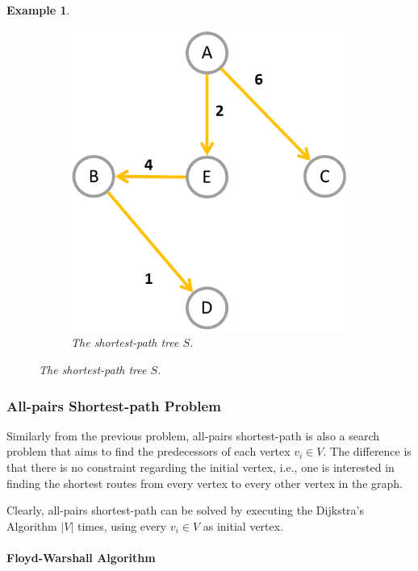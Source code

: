 \documentclass[12pt]{report}
\newtheorem{example}{Example}[section]
\begin{document}
\begin{example}
\begin{figure}[H]
\begin{subfigure}{.4\linewidth}
			\includegraphics[width=\linewidth]{graphs/spa-tree}
			\captionsetup{justification=centering}
			\caption{The shortest-path tree $S$.}
			\label{fig:spa-tree}
		\end{subfigure}
	\end{figure}
\end{example}

\subsubsection{All-pairs Shortest-path Problem}

Similarly from the previous problem, all-pairs shortest-path is also a search problem that aims to find the predecessors of each vertex $v_i \in V$. The difference is that there is no constraint regarding the initial vertex, i.e., one is interested in finding the shortest routes from every vertex to every other vertex in the graph.

Clearly, all-pairs shortest-path can be solved by executing the Dijkstra's Algorithm $|V|$ times, using every $v_i \in V$ as initial vertex.

\paragraph{Floyd-Warshall Algorithm \cite{golin2003floydwarshall}}
\end{document}
